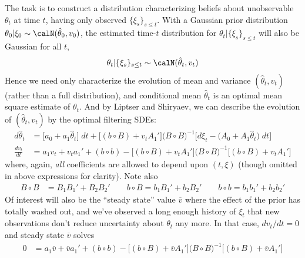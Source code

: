 \documentclass[12pt]{article}
\theoremstyle{plain}
\theoremstyle{definition}
\theoremstyle{remark}
\begin{document}
The task is to construct a distribution characterizing beliefs about
unobservable $\theta_t$ at time $t$, having only observed
$\{\xi_s\}_{s\leq t}$.
With a Gaussian prior distribution
$\theta_0|\xi_0\sim\calN(\hat{\theta}_0,v_0)$, the estimated time-$t$
distribution for $\theta_t|\{\xi_s\}_{s\leq t}$ will
also be Gaussian for all $t$,
\begin{align*}
  \theta_t|\{\xi_s\}_{s\leq t}\sim\calN(\hat{\theta}_t,v_t)
\end{align*}
Hence we need only characterize the evolution of mean and variance
$(\hat{\theta}_t,v_t)$ %
(rather than a full distribution), and conditional mean $\hat{\theta}_t$
is an optimal mean square estimate of $\theta_t$.
And by Liptser and Shiryaev, we can describe the evolution of
$(\hat{\theta}_t,v_t)$ by the optimal filtering SDEs:
\begin{align*}
  d\hat{\theta}_t &=
  \big[
  a_0 + a_1\hat{\theta}_t
  \big]\;dt
  +
  \big[
    (b\circ B)
    + v_t A_1'
  \big]
  \big(B\circ B\big)^{-1}
  \big[
    d\xi_t - \big(A_0+A_1\hat{\theta}_t\big)\;dt
  \big]
  \\
  \frac{dv_t}{dt}
  &=
  a_1v_t
  + v_t a_1'
  + (b\circ b)
  -
  \big[
    (b\circ B)
    + v_tA_1'
  \big]
  \big(B\circ B\big)^{-1}
  \big[
    (b\circ B)
    + v_tA_1'
  \big]
\end{align*}
where, again, \emph{all} coefficients are allowed to depend upon
$(t,\xi)$ (though omitted in above expressions for clarity).
Note also
\begin{align*}
  B \circ B
  &= B_1B_1' + B_2B_2'
  \qquad
  b\circ B
  = b_1B_1' + b_2B_2'
  \qquad
  b\circ b
  = b_1b_1' + b_2b_2'
\end{align*}
Of interest will also be the ``steady state'' value $\overline{v}$ where the
effect of the prior has totally washed out, and we've observed a long
enough history of $\xi_t$ that new observations don't reduce uncertainty
about $\theta_t$ any more. In that case, $dv_t/dt=0$ and steady
state $\overline{v}$ solves
\begin{align*}
  0
  &=
  a_1\overline{v}
  + \overline{v} a_1'
  + (b\circ b)
  -
  \big[
    (b\circ B)
    + \overline{v}A_1'
  \big]
  \big(B\circ B\big)^{-1}
  \big[
    (b\circ B)
    + \overline{v}A_1'
  \big]
\end{align*}
\end{document}
